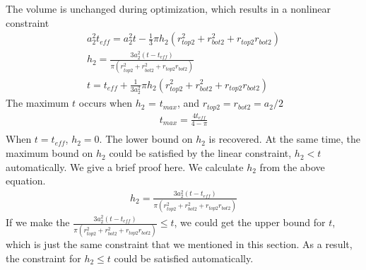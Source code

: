 \documentclass[12pt]{article}
\numberwithin{equation}{section}
\numberwithin{equation}{section}
\begin{document}
The volume is unchanged during optimization, which results in a nonlinear constraint
\begin{align}
 a_{2}^2t_{eff} =a_{2}^2t - \frac{1}{3}\pi h_2(r_{top2}^2+r_{bot2}^2+r_{top2}r_{bot2})\nonumber \\
 h_2 = \frac{3a_{2}^2(t - t_{eff} )}{\pi(r_{top2}^2+r_{bot2}^2+r_{top2}r_{bot2})} \nonumber \\
 t = t_{eff} + \frac {1}{3a_2^2} \pi h_2(r_{top2}^2+r_{bot2}^2+r_{top2}r_{bot2})
 \end{align}
The maximum $t$ occurs when $h_2$ = $t_{max}$, and $r_{top2} = r_{bot2} = a_2/2$
\begin{align*}
t_{max} = \frac {4t_{eff}}{4-\pi} \\
\end{align*}
When $t = t_{eff}$, $h_2 = 0$.  The lower bound on $h_2$ is recovered. At the same time, the maximum bound on $h_2$ could be satisfied by the linear constraint, $h_2 < t$ automatically. We give a brief proof here. We calculate $h_2$ from the above equation.
\begin{align*}
h_2 = \frac{3a_{2}^2(t - t_{eff} )}{\pi(r_{top2}^2+r_{bot2}^2+r_{top2}r_{bot2})} 
\end{align*}
If we make the $\frac{3a_{2}^2(t - t_{eff} )}{\pi(r_{top2}^2+r_{bot2}^2+r_{top2}r_{bot2})} \leq t$, we could get the upper bound for $t$, which is just the same constraint that we mentioned in this section. As a result, the constraint for $h_{2} \leq t$ could be satisfied automatically.

\end{document}
